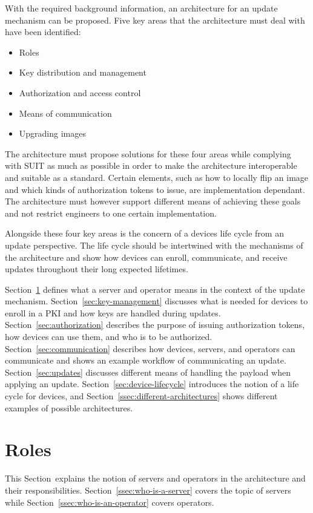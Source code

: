 \documentclass[0-thesis.tex]{subfiles}
\begin{document}
With the required background information, an architecture for an update mechanism can be
proposed. Five key areas that the architecture must deal with have been identified:

\begin{itemize}
    \item Roles
    \item Key distribution and management
    \item Authorization and access control
    \item Means of communication
    \item Upgrading images
\end{itemize}

The architecture must propose solutions for these four areas while complying with SUIT as
much as possible in order to make the architecture interoperable and suitable as a
standard. Certain elements, such as how to locally flip an image and which kinds of
authorization tokens to issue, are implementation dependant. The architecture must however
support different means of achieving these goals and not restrict engineers to one certain
implementation.

Alongside these four key areas is the concern of a devices life cycle from an update
perspective. The life cycle should be intertwined with the mechanisms of the architecture
and show how devices can enroll, communicate, and receive updates throughout their long
expected lifetimes. 

Section~\ref{sec:roles} defines what a server and operator means in the context of the
update mechanism. Section~\ref{sec:key-management} discusses what is needed for devices to
enroll in a PKI and how keys are handled during updates. Section~\ref{sec:authorization}
describes the purpose of issuing authorization tokens, how devices can use them, and who
is to be authorized. Section~\ref{sec:communication} describes how devices, servers, and
operators can communicate and shows an example workflow of communicating an update.
Section~\ref{sec:updates} discusses different means of handling the payload when applying
an update. Section~\ref{sec:device-lifecycle} introduces the notion of a life cycle for
devices, and Section~\ref{ssec:different-architectures} shows different examples of
possible architectures.

\section{Roles}
\label{sec:roles}
This Section~explains the notion of servers and operators in the architecture and their
responsibilities. Section~\ref{ssec:who-is-a-server} covers the topic of servers while
Section~\ref{ssec:who-is-an-operator} covers operators.
\end{document}
